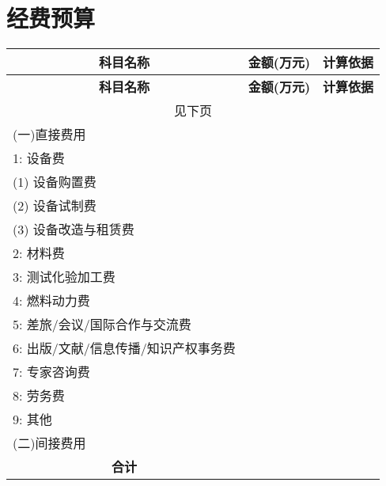 \documentclass{sklcApplicant}
\begin{document}
\section{经费预算}
\begin{center}
	\begin{longtable}{|m{96pt}|m{36pt}|m{220pt}|}
		
		\hline
		\multicolumn{1}{|c|}{\bf 科目名称} & \multicolumn{1}{c|}{\bf 金额(万元)} & \multicolumn{1}{c|}{\bf 计算依据}\\
		\endfirsthead
		
		\hline
		\multicolumn{1}{|c|}{\bf 科目名称} & \multicolumn{1}{c|}{\bf 金额(万元)} & \multicolumn{1}{c|}{\bf 计算依据}\\
		\endhead
		
		\multicolumn{3}{|c|}{见下页}\\
		\hline
		\endfoot
		\hline
		\endlastfoot
		\hline
        (一)直接费用& \budgetOfDirectValue	&  \budgetOfDirectComment\\
        \hline	
		1: 设备费 & \budgetOfEquipmentValue	&   \budgetOfEquipmentComment	\\		\hline
		\quad (1) 设备购置费 & \budgetOfEquipmentBuyValue	& \budgetOfEquipmentBuyComment	\\		
		\hline
		\quad (2) 设备试制费 & \budgetOfEquipmentBuildValue	& \budgetOfEquipmentBuildComment	\\		
		\hline
		\quad (3) 设备改造与租赁费 & \budgetOfEquipmentModifyAndRentValue	& 	\budgetOfEquipmentModifyAndRentComment\\
		\hline
		2: 材料费 & \budgetOfMaterialValue	& \budgetOfMaterialComment	\\
		\hline
		3: 测试化验加工费 & \budgetOfTestValue	& \budgetOfTestComment	\\		
		\hline
		4: 燃料动力费 & \budgetOfFuelValue 	& 	\budgetOfFuelComment\\		
		\hline
		5: 差旅/会议/国际合作与交流费 & \budgetOfTravelValue	& \budgetOfTravelComment	\\		
		\hline
		6: 出版/文献/信息传播/知识产权事务费 & \budgetOfPublishValue	& \budgetOfPublishComment	\\		\hline
		7: 专家咨询费 & \budgetOfExpertValue	& \budgetOfExpertComment	\\		
		\hline
		8: 劳务费 & \budgetOfServiceValue	& \budgetOfServiceComment	\\		
		\hline
		9: 其他 & \budgetOfOthersValue	& \budgetOfOthersComment	\\		
		\hline
		(二)间接费用 & \budgetOfOverheadValue	& \budgetOfOverheadComment	\\		
		\hline
		\multicolumn{1}{|c|}{\bf 合计} & \projMoneyValue	& 	\\		
		\hline
	\end{longtable}
	\end{center}
\end{document}
